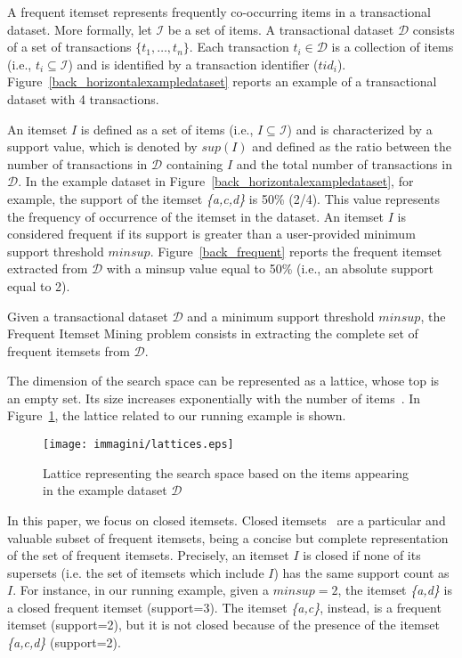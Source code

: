 A frequent itemset represents frequently  co-occurring items in a transactional dataset. 
More formally, let $\mathcal{I}$ be a set of items. A transactional dataset $\mathcal{D}$
consists of a set of transactions $\{t_1, \dots, t_n\}$.
Each transaction $t_i\in \mathcal{D}$ is a collection of items
(i.e., $t_i\subseteq \mathcal{I}$)
and is identified by a transaction identifier ($tid_i$).
Figure~\ref{back_horizontalexampledataset} reports an example of a transactional
dataset with 4 transactions.


An itemset $I$ is defined as a set of items (i.e., $I\subseteq\mathcal{I}$)
and is characterized by a support value, which is denoted by $sup(I)$ and
defined as the ratio between the number of transactions in $\mathcal{D}$
containing $I$ and the total number of transactions in $\mathcal{D}$.
In the example dataset in Figure~\ref{back_horizontalexampledataset}, for example,
the support of the itemset \textit{\{a,c,d\}} is 50\% (2/4). This value represents the frequency of occurrence of the itemset in the dataset. An itemset $I$ is considered frequent if its support is greater than a
user-provided minimum support threshold $minsup$. Figure~\ref{back_frequent}
reports the frequent itemset extracted from $\mathcal{D}$ with a minsup value equal to 50\% (i.e., an absolute support equal to 2).

Given a transactional dataset $\mathcal{D}$ and a minimum support
threshold $minsup$, the Frequent Itemset Mining \cite{SurveyHan2007} problem
consists in extracting the complete set of frequent itemsets
from $\mathcal{D}$.

The dimension of the search space can be represented as a lattice, whose top is an empty set. Its size increases exponentially with the number of items~\cite{goethals2003survey}.
In Figure~\ref{lattice}, the lattice related to our running example is shown.

\begin{figure}[!t]
\texttt{[image: immagini/lattices.eps]}
\caption{Lattice representing the search space based on the items appearing in the example dataset $\mathcal{D}$}
\label{lattice}
\end{figure}


In this paper, we focus on closed itemsets.
Closed itemsets~\cite{ClosedPasquier1999} are a
particular and valuable subset of frequent itemsets, being
a concise but complete representation of the set of frequent itemsets. 
Precisely, an itemset $I$ is closed if none of its supersets (i.e. the set of itemsets which include $I$) has the same support count as $I$. For instance, in our running example, given a $minsup=2$, the itemset \textit{\{a,d\}} is a closed frequent itemset (support=3). The itemset \textit{\{a,c\}}, instead, is a frequent itemset (support=2), but it is not closed because of the presence of the itemset \textit{\{a,c,d\}} (support=2). 

